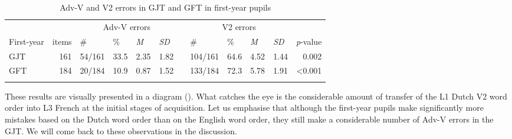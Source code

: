 \documentclass[output=paper,modfonts,nonflat, newtxmath]{langsci/langscibook}
\begin{document}
\begin{table}
\caption{Adv-V and V2 errors in GJT and GFT in first-year pupils}
\label{tab:stadt:4}
\footnotesize
\begin{tabularx}{0.93\textwidth}{p{1.3cm} r p{0.5cm} p{0.5cm} p{0.5cm} p{0.5cm} p{0.0001cm} p{0.7cm }p{0.3cm} p{0.3cm} p{0.3cm} r}
	\lsptoprule
&  &   \multicolumn{4}{c}{Adv-V errors} & &  \multicolumn{4}{c}{V2 errors} & \\
First-year & items & \# & \% & \textit{M} & \textit{SD}&  & \# & \% & \textit{M} & \textit{SD} & \textit{p}-value\\
\cmidrule{3-6}  \cmidrule{8-11}
GJT & 161 & 54/161 & 33.5 & 2.35 & 1.82 & & 104/161 & 64.6 & 4.52 & 1.44 & 0.002\\
GFT & 184 & 20/184 & 10.9\footnotemark{} & 0.87 & 1.52 & & 133/184 & 72.3 & 5.78 & 1.91 & <0.001\\
\lspbottomrule
\end{tabularx}
\end{table}

These results are visually presented in a diagram (). What catches the eye is the considerable amount of transfer of the L1 Dutch V2 word order into L3 French at the initial stages of acquisition. Let us emphasise that although the first-year pupils make significantly more mistakes based on the Dutch word order than on the English word order, they still make a considerable number of Adv-V errors in the GJT. We will come back to these observations in the discussion.
\end{document}

